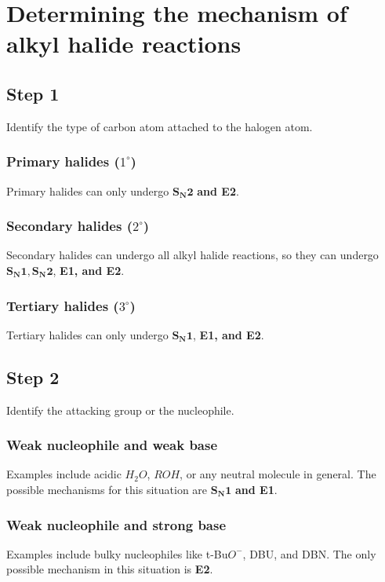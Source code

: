 \documentclass[11pt]{article}
\begin{document}
\newpage

\section{Determining the mechanism of alkyl halide reactions}
\label{sec:orgf7f67ef}

\subsection{Step 1}
\label{sec:org52b670a}
Identify the type of carbon atom attached to the halogen atom.

\subsubsection{Primary halides (\(1^{\circ}\))}
\label{sec:orgda69896}
Primary halides can only undergo \(\boldsymbol{S_N 2}\) \textbf{and E2}.

\subsubsection{Secondary halides (\(2^{\circ}\))}
\label{sec:orgb4d22e6}
Secondary halides can undergo all alkyl halide reactions, so they can undergo \(\boldsymbol{S_N 1, S_N 2}\), \textbf{E1, and E2}.

\subsubsection{Tertiary halides (\(3^{\circ}\))}
\label{sec:orgf8ed5da}
Tertiary halides can only undergo \(\boldsymbol{S_N 1}\), \textbf{E1, and E2}.

\subsection{Step 2}
\label{sec:orgda6b3e2}
Identify the attacking group or the nucleophile.

\subsubsection{Weak nucleophile and weak base}
\label{sec:org9e21fb1}
Examples include acidic \(H_2 O\), \(ROH\), or any neutral molecule in general. The possible mechanisms for this situation are \(\boldsymbol{S_N 1}\) \textbf{and E1}.

\subsubsection{Weak nucleophile and strong base}
\label{sec:org55fe6c7}
Examples include bulky nucleophiles like t-Bu\(O^-\), DBU, and DBN. The only possible mechanism in this situation is \textbf{E2}.
\end{document}
